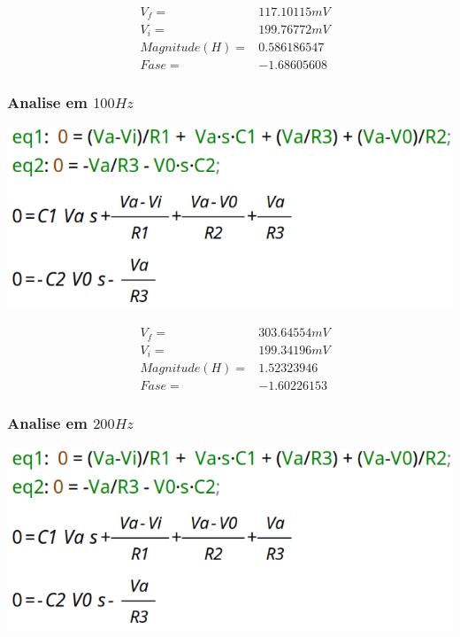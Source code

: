 \documentclass[12pt,twoside, a4paper, twocolumn]{article}
\begin{document}
\begin{equation*}
    \begin{aligned}
         & V_f =          & 117.10115mV \\
         & V_i =          & 199.76772mV \\
         & Magnitude(H) = & 0.586186547 \\
         & Fase =         & -1.68605608
    \end{aligned}
\end{equation*}


\subsubsection{Analise em $100Hz$}


\begin{adjustbox}{scale=0.09}
    \includegraphics{eqs.png}
\end{adjustbox}


\begin{equation*}
    \begin{aligned}
         & V_f =          & 303.64554mV \\
         & V_i =          & 199.34196mV \\
         & Magnitude(H) = & 1.52323946  \\
         & Fase =         & -1.60226153
    \end{aligned}
\end{equation*}




\subsubsection{Analise em $200Hz$}


\begin{adjustbox}{scale=0.09}
    \includegraphics{eqs.png}
\end{adjustbox}
\end{document}

